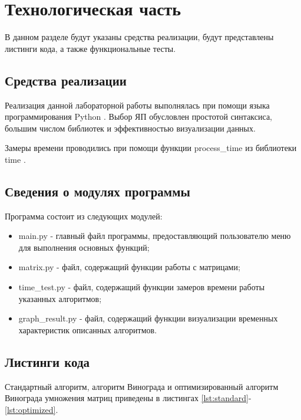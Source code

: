 \chapter{Технологическая часть}

В данном разделе будут указаны средства реализации, будут представлены листинги кода, а также функциональные тесты.

\section{Средства реализации}

Реализация данной лабораторной работы выполнялась при помощи языка программирования Python \cite{python}. Выбор ЯП обусловлен простотой синтаксиса, большим числом библиотек и эффективностью визуализации данных.

Замеры времени проводились при помощи функции process\_time из библиотеки time \cite{python-time}.

\section{Сведения о модулях программы}

Программа состоит из следующих модулей:

\begin{itemize}
	\item main.py - главный файл программы, предоставляющий пользователю меню для выполнения основных функций;
	\item matrix.py - файл, содержащий функции работы с матрицами;
	\item time\_test.py - файл, содержащий функции замеров времени работы указанных алгоритмов;
	\item graph\_result.py - файл, содержащий функции визуализации временных характеристик описанных алгоритмов.
\end{itemize}

\section{Листинги кода}

Стандартный алгоритм, алгоритм Винограда и оптимизированный алгоритм Винограда умножения матриц приведены в листингах \ref{lst:standard}-\ref{lst:optimized}.

